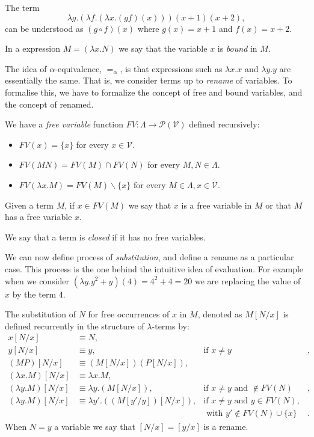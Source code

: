 \begin{example} The term $$\lambda g.(\lambda f.(\lambda x. (gf)(x) )) (x+1)(x+2),$$
  can be understood as $(g\circ f) (x)$ where $g(x) = x+1$ and $f(x)=x+2$.
\end{example}

In a expression $M = (\lambda x. N)$ we say that the variable $x$ is \emph{bound} in $M$.


The idea of $\alpha$-equivalence, $=_{\alpha}$, is that expressions such as $\lambda x.x$ and $\lambda y.y$ are essentially the same. That is, we consider terms up to \emph{rename} of variables. To formalise this, we have to formalize the concept of free and bound variables, and the concept of renamed.

\begin{definition}
  We have a \emph{free variable} function $FV:\Lambda \to \mathcal{P}(\mathcal{V})$ defined recursively:
  \begin{itemize}
  \item $FV(x) = \{x\}$ for every $x\in \mathcal{V}$.
  \item $FV(MN) = FV(M)\cap FV(N)$ for every $M,N\in \Lambda$.
  \item $FV(\lambda x.M) = FV(M)\backslash \{x\}$ for every $M\in \Lambda, x\in \mathcal{V}$.
  \end{itemize}
  Given a term $M$, if $x\in FV(M)$ we say that $x$ is a free variable in $M$ or that $M$ has a free variable $x$.
\end{definition}

\begin{definition}
  We say that a term is \emph{closed} if it has no free variables.
\end{definition}
We can now define process of \emph{substitution}, and define a rename as a particular case. This process is the one behind the intuitive idea of evaluation. For example when we consider $(\lambda y. y^2+y)(4) = 4^2+4 = 20$ we are replacing the value of $x$ by the term $4$. 
\begin{definition}\label{def:substition}
  The substitution of $N$ for free occurrences of $x$ in $M$, denoted as $M[N/x]$ is defined recurrently in the structure of $\lambda$-terms by:
  \begin{align*}
    x[N/x]& \equiv N,\\
    y[N/x]& \equiv y, &  \text{if } x\ne y&,\\
    (MP)[N/x]& \equiv (M[N/x])(P[N/x]),\\
    (\lambda x.M)[N/x] & \equiv \lambda x.M,\\
    (\lambda y.M)[N/x] & \equiv \lambda y.(M[N/x]), & \text{if } x\ne y \text{ and } \not \in FV(N)&,\\
    (\lambda y.M)[N/x] & \equiv \lambda y'.((M[y'/y])[N/x]), & \text{if } x\ne y \text{ and } y\in FV(N),\\
          & & \text{ with } y' \not \in FV(N) \cup \{x\}&.
  \end{align*}
  When $N = y$ a variable we say that $[N/x] = [y/x]$ is a rename. 
\end{definition}

